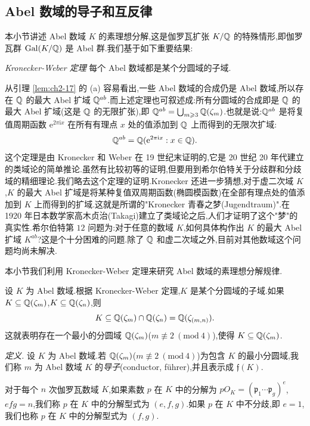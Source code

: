 \subsection{Abel 数域的导子和互反律}\label{sec:ch2-s4-2}

本小节讲述 Abel 数域 $K$ 的素理想分解,这是伽罗瓦扩张 $K/\mathbb{Q}$ 的特殊情形,即伽罗瓦群 $\operatorname{Gal}(K/\mathbb{Q})$ 是 Abel 群.我们基于如下重要结果:

\emph{Kronecker-Weber 定理} 每个 Abel 数域都是某个分圆域的子域.

从引理 \ref{lem:ch2-17} 的 (a) 容易看出,一些 Abel 数域的合成仍是 Abel 数域,所以存在 $\mathbb{Q}$ 的最大 Abel 扩域 $\mathbb{Q}^{ab}$.而上述定理也可叙述成:所有分圆域的合成即是 $\mathbb{Q}$ 的最大 Abel 扩域(这是 $\mathbb{Q}$ 的无限扩张),即 $\mathbb{Q}^{ab}=\bigcup_{m\geqslant 3}\mathbb{Q}(\zeta_m)$.也就是说:$\mathbb{Q}^{ab}$ 是将复值周期函数 $\mathrm{e}^{2\pi\mathrm{i}x}$ 在所有有理点 $x$ 处的值添加到 $\mathbb{Q}$ 上而得到的无限次扩域:
\[
  \mathbb{Q}^{ab}=\mathbb{Q}(\mathrm{e}^{2\pi\mathrm{i}x}:x\in\mathbb{Q}).
\]
这个定理是由 Kronecker 和 Weber 在 19 世纪末证明的,它是 20 世纪 20 年代建立的类域论的简单推论.虽然有比较初等的证明,但要用到希尔伯特关于分歧群和分歧域的精细理论.我们略去这个定理的证明.Kronecker 还进一步猜想,对于虚二次域 $K$,$K$ 的最大 Abel 扩域是将某种复值双周期函数(椭圆模函数)在全部有理点处的值添加到 $K$ 上而得到的扩域.这就是所谓的"Kronecker 青春之梦(Jugendtraum)".在 1920 年日本数学家高木贞治(Takagi)建立了类域论之后,人们才证明了这个"梦"的真实性.希尔伯特第 $12$ 问题为:对于任意的数域 $K$,如何具体构作出 $K$ 的最大 Abel 扩域 $K^{ab}$?这是个十分困难的问题.除了 $\mathbb{Q}$ 和虚二次域之外,目前对其他数域这个问题均尚未解决.

本小节我们利用 Kronecker-Weber 定理来研究 Abel 数域的素理想分解规律.

设 $K$ 为 Abel 数域.根据 Kronecker-Weber 定理,$K$ 是某个分圆域的子域.如果 $K\subseteq\mathbb{Q}(\zeta_m)$,$K\subseteq\mathbb{Q}(\zeta_n)$,则
\[
  K\subseteq\mathbb{Q}(\zeta_m)\cap\mathbb{Q}(\zeta_n)=\mathbb{Q}(\zeta_{(m,n)}).
\]
这就表明存在一个最小的分圆域 $\mathbb{Q}(\zeta_m)$($m\not\equiv 2\ (\mathrm{mod}\ 4)$),使得 $K\subseteq\mathbb{Q}(\zeta_m)$.

\emph{定义.} 设 $K$ 为 Abel 数域.若 $\mathbb{Q}(\zeta_m)$($m\not\equiv 2\ (\mathrm{mod}\ 4)$)为包含 $K$ 的最小分圆域,我们称 $m$ 为 Abel 数域 $K$ 的\emph{导子}(conductor, führer),并且表示成 $\mathfrak{f}(K)$.

\begin{definition}\label{def:ch2-6}
对于每个 $n$ 次伽罗瓦数域 $K$,如果素数 $p$ 在 $K$ 中的分解为 $pO_K=(\mathfrak{p}_1\cdots\mathfrak{p}_g)^e$,$efg=n$,我们称 $p$ 在 $K$ 中的分解型式为 $(e,f,g)$.如果 $p$ 在 $K$ 中不分歧,即 $e=1$,我们也称 $p$ 在 $K$ 中的分解型式为 $(f,g)$.
\end{definition}

